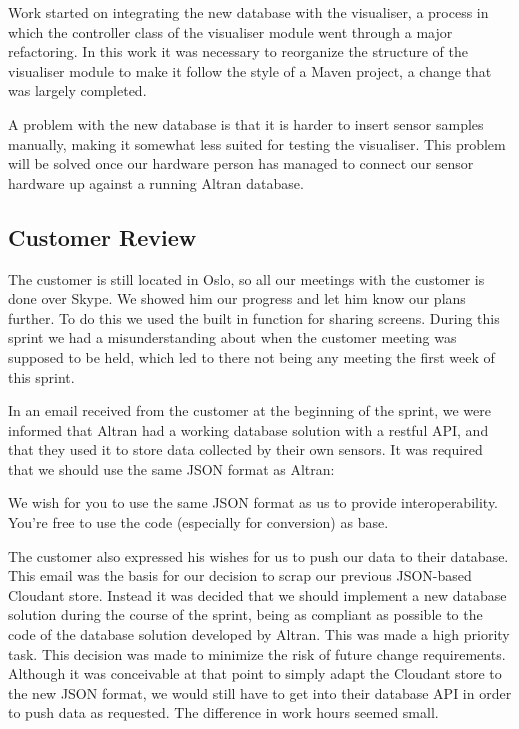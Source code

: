 \documentclass[../document]{subfiles}
\begin{document}
Work started on integrating the new database with the visualiser, a process in which the controller class of the visualiser module went through a major refactoring. In this work it was necessary to reorganize the structure of the visualiser module to make it follow the style of a Maven project, a change that was largely completed.

A problem with the new database is that it is harder to insert sensor samples manually, making it somewhat less suited for testing the visualiser. This problem will be solved once our hardware person has managed to connect our sensor hardware up against a running \gls{Altran} database.

\subsection{Customer Review}
The customer is still located in Oslo, so all our meetings with the customer is done over Skype. We showed him our progress and let him know our plans further. To do this we used the built in function for sharing screens. During this sprint we had a misunderstanding about when the customer meeting was supposed to be held, which led to there not being any meeting the first week of this sprint.

In an email received from the customer at the beginning of the sprint, we were informed that \gls{Altran} had a working database solution with a restful \gls{API}, and that they used it to store data collected by their own sensors. It was required that we should use the same \gls{JSON} format as \gls{Altran}:

\begin{italicquotation}
We wish for you to use the same \gls{JSON} format as us to provide interoperability. You’re free to use the code (especially for conversion) as base.
\end{italicquotation}

The customer also expressed his wishes for us to push our data to their database. This email was the basis for our decision to scrap our previous \gls{JSON}-based \gls{Cloudant} store. Instead it was decided that we should implement a new database solution during the course of the sprint, being as compliant as possible to the code of the database solution developed by \gls{Altran}. This was made a high priority task. This decision was made to minimize the risk of future change requirements. Although it was conceivable at that point to simply adapt the \gls{Cloudant} store to the new \gls{JSON} format, we would still have to get into their database \gls{API} in order to push data as requested. The difference in work hours seemed small.
\end{document}
